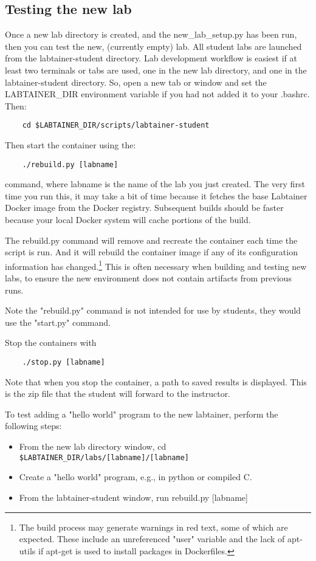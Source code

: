 \documentclass[12pt]{article}
\begin{document}
\subsection{Testing the new lab}
Once a new lab directory is created, and the new\_lab\_setup.py has been run, then 
you can test the new, (currently empty) lab.  All student labs are launched from the
labtainer-student directory.  Lab development workflow is easiest if at least two
terminals or tabs are used, one in the new lab directory, and one in the labtainer-student
directory.  So, open a new tab or window and set the LABTAINER\_DIR environment variable
if you had not added it to your .bashrc.  Then:

\begin{verbatim}
    cd $LABTAINER_DIR/scripts/labtainer-student
\end{verbatim}
Then start the container using the:

\begin{verbatim}
    ./rebuild.py [labname] 
\end{verbatim}
command, where labname is the name of the lab you just created.  
The very first time you run this, it may take a bit of time because it fetches the 
base Labtainer Docker image from the Docker registry.  Subsequent builds
should be faster because your local Docker system will cache portions of the build.  

The rebuild.py command will remove and recreate the container
each time the script is run.  And it will rebuild the container image if any of its configuration 
information has changed.\footnote{The build process may generate warnings in red text, some of which are expected.  
These include an unreferenced "user" variable and the lack of apt-utils if apt-get is used to install packages in 
Dockerfiles.}  This is often necessary when building and testing new labs, to ensure the
new environment does not contain artifacts from previous runs.

Note the "rebuild.py" command is not intended for use by students, they would use the "start.py" command.  

Stop the containers with 
\begin{verbatim}
    ./stop.py [labname]
\end{verbatim}
Note that when you stop the container, a path to saved results is displayed.
This is the zip file that the student will forward to the instructor.

To test adding a "hello world" program to the new labtainer, perform the following steps:
\begin{itemize}
\item From the new lab directory window, cd \verb!$LABTAINER_DIR/labs/[labname]/[labname]!
\item Create a "hello world" program, e.g., in python or compiled C.
\item From the labtainer-student window, run rebuild.py [labname]
\end{itemize}
    
\end{document}
